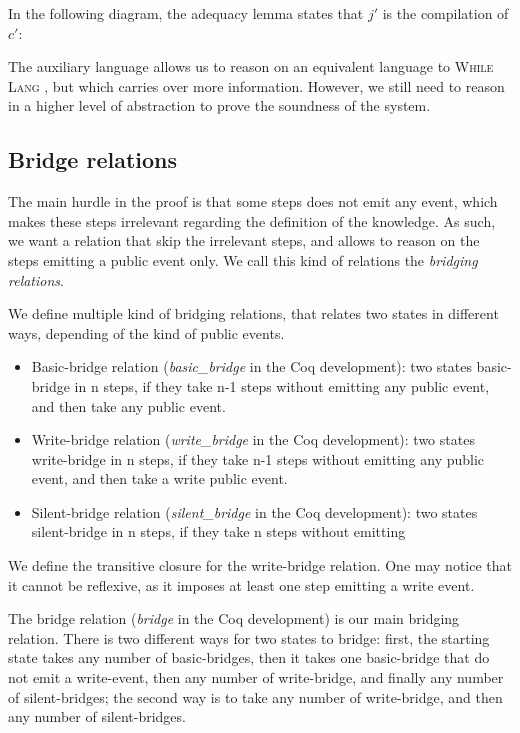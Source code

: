 \documentclass[10pt]{article}
\newcommand{\whilelang}{\textsc{While Lang} }
\newcommand{\compile}[1]{ #1 \downarrow }
\begin{document}
In the following diagram, the adequacy lemma states that $j'$ is the compilation of $c'$:

The auxiliary language allows us to reason on an equivalent language to \whilelang, but which
carries over more information. However, we still need to reason in a higher level of abstraction to
prove the soundness of the system.

\subsection{Bridge relations}%
\label{subsec:brigde_rel}

The main hurdle in the proof is that some steps does not emit any event, which makes these steps
irrelevant regarding the definition of the knowledge. As such, we want a relation that skip the
irrelevant steps, and allows to reason on the steps emitting a public event only.
We call this kind of relations the \emph{bridging relations}.

We define multiple kind of bridging relations, that relates two states in different ways, depending
of the kind of public events.

\begin{itemize}
  \item Basic-bridge relation (\emph{basic\_bridge} in the Coq development):
        two states basic-bridge in n steps, if they take n-1 steps without emitting any public
        event, and then take any public event.
  \item Write-bridge relation (\emph{write\_bridge} in the Coq development):
        two states write-bridge in n steps, if they take n-1 steps without emitting any public
        event, and then take a write public event.
  \item Silent-bridge relation (\emph{silent\_bridge} in the Coq development):
        two states silent-bridge in n steps, if they take n steps without emitting
\end{itemize}

We define the transitive closure for the write-bridge relation. One may notice that it cannot be
reflexive, as it imposes at least one step emitting a write event.

The bridge relation (\emph{bridge} in the Coq development) is our main bridging relation. There is
two different ways for two states to bridge:
first, the starting state takes any number of basic-bridges, then it takes one basic-bridge that do
not emit a write-event, then any number of write-bridge, and finally any number of silent-bridges;
the second way is to take any number of write-bridge, and then any number of silent-bridges.
\end{document}
